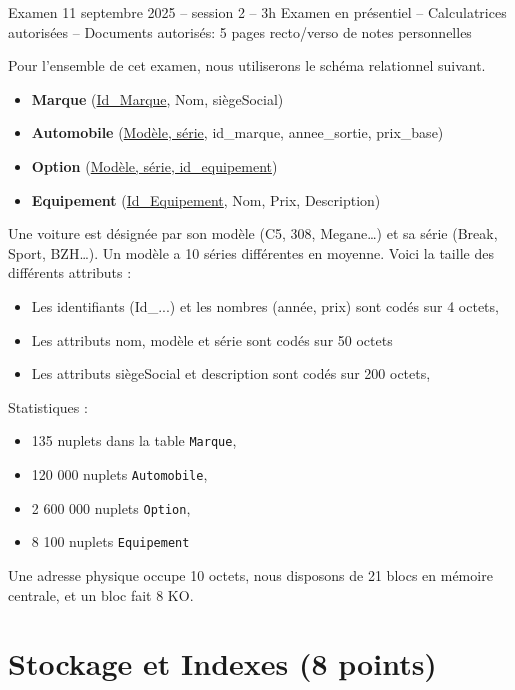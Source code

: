%
{Examen 11 septembre 2025 -- session 2 -- 3h}%
{Examen en présentiel -- Calculatrices autorisées -- Documents autorisés: 5 pages recto/verso de notes personnelles}%

Pour l'ensemble de cet examen, nous utiliserons le schéma relationnel suivant.

\begin{itemize}
 \item \textbf{Marque} (\underline{Id\_Marque}, Nom, siègeSocial)\\
 \item \textbf{Automobile} (\underline{Modèle, série}, id\_marque, annee\_sortie, prix\_base)\\
 \item \textbf{Option} (\underline{Modèle, série, id\_equipement})\\
 \item \textbf{Equipement} (\underline{Id\_Equipement}, Nom, Prix, Description)\\
\end{itemize}

Une voiture est désignée par son modèle (C5, 308, Megane\ldots) et sa série (Break, Sport, BZH\ldots).
Un modèle a 10 séries différentes en moyenne. Voici la taille des différents attributs :
\begin{itemize}
    \item Les identifiants (Id\_...) et les nombres (année, prix) sont codés sur 4 octets,
    \item Les attributs nom, modèle et série sont codés sur 50 octets
    \item Les attributs siègeSocial et description sont codés sur 200 octets,
\end{itemize}

Statistiques :
\begin{itemize}
    \item 135 nuplets dans la table {\tt Marque},
    \item 120 000 nuplets {\tt Automobile},
    \item 2 600 000 nuplets {\tt Option},
    \item 8 100 nuplets {\tt Equipement}
\end{itemize}

Une adresse physique occupe 10 octets, nous disposons de 21 blocs en 
mémoire centrale, et un bloc fait 8 KO.

\section{Stockage et Indexes (8 points)}


